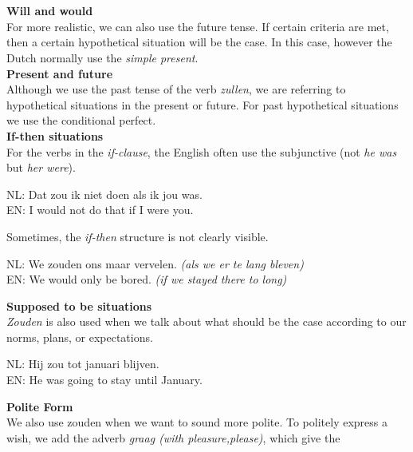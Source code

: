\documentclass[letterpaper,11pt]{article}
\begin{document}
\\ \\
\textbf{Will and would} \\
For more realistic, we can also use the future tense. If certain criteria are
met, then a certain hypothetical situation will be the case. In this case,
however the Dutch normally use the \textit{simple present}.
\\
\textbf{Present and future} \\
Although we use the past tense of the verb \textit{zullen}, we are referring to
hypothetical situations in the present or future. For past hypothetical
situations we use the conditional perfect.
\\
\textbf{If-then situations} \\
For the verbs in the \textit{if-clause}, the English often use the
subjunctive (not \textit{he was} but \textit{her were}).
\\
\begin{small}
    \indent NL: Dat zou ik niet doen als ik jou was. \\
    \indent EN: I would not do that if I were you. \\
\end{small}
Sometimes, the \textit{if-then} structure is not clearly visible.
\\
\begin{small}
    \indent NL: We zouden ons maar vervelen. \textit{(als we er te lang bleven)} \\
    \indent EN: We would only be bored. \textit{(if we stayed there to long)} \\
\end{small}
\textbf{Supposed to be situations} \\
\textit{Zouden} is also used when we talk about what should be the case
according to our norms, plans, or expectations. \\
\begin{small}
    \indent NL: Hij zou tot januari blijven. \\
    \indent EN: He was going to stay until January. \\
\end{small}
\textbf{Polite Form} \\
We also use zouden when we want to sound more polite. To politely express a
wish, we add the adverb \textit{graag (with pleasure,please)}, which give the
\end{document}
